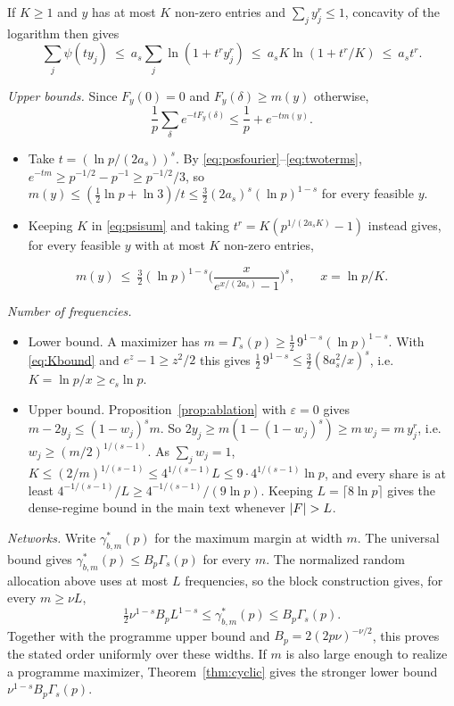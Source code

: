 If $K\ge1$ and $y$ has at most $K$ non-zero entries and $\sum_jy_j^r\le1$, concavity of the logarithm then gives
\begin{equation}
\sum_j\psi(ty_j)\ \le\ a_s\sum_j\ln(1+t^ry_j^r)\ \le\ a_sK\ln(1+t^r/K)\ \le\ a_st^r .
\label{eq:psisum}
\end{equation}

\emph{Upper bounds.} Since $F_y(0)=0$ and $F_y(\delta)\ge m(y)$ otherwise,
\begin{equation}
\frac1p\sum_\delta e^{-tF_y(\delta)}\le\frac1p+e^{-tm(y)}.
\label{eq:twoterms}
\end{equation}
\begin{itemize}
\item Take $t=(\ln p/(2a_s))^s$. By \eqref{eq:posfourier}--\eqref{eq:twoterms}, $e^{-tm}\ge p^{-1/2}-p^{-1}\ge p^{-1/2}/3$, so $m(y)\le(\frac12\ln p+\ln3)/t\le\frac32(2a_s)^s(\ln p)^{1-s}$ for every feasible $y$.
\item Keeping $K$ in \eqref{eq:psisum} and taking $t^r=K(p^{1/(2a_sK)}-1)$ instead gives, for every feasible $y$ with at most $K$ non-zero entries,
\end{itemize}
\begin{equation}
m(y)\ \le\ \tfrac32(\ln p)^{1-s}\Big(\frac{x}{e^{x/(2a_s)}-1}\Big)^s,\qquad x=\ln p/K.
\label{eq:Kbound}
\end{equation}

\emph{Number of frequencies.}
\begin{itemize}
\item Lower bound. A maximizer has $m=\Gamma_s(p)\ge\tfrac12\,9^{1-s}(\ln p)^{1-s}$. With \eqref{eq:Kbound} and $e^z-1\ge z^2/2$ this gives $\tfrac12\,9^{1-s}\le\frac32(8a_s^2/x)^s$, i.e.\ $K=\ln p/x\ge c_s\ln p$.
\item Upper bound. Proposition~\ref{prop:ablation} with $\varepsilon=0$ gives $m-2y_j\le(1-w_j)^sm$. So $2y_j\ge m(1-(1-w_j)^s)\ge m\,w_j=m\,y_j^r$, i.e.\ $w_j\ge(m/2)^{1/(s-1)}$. As $\sum_jw_j=1$, $K\le(2/m)^{1/(s-1)}\le4^{1/(s-1)}L\le9\cdot4^{1/(s-1)}\ln p$, and every share is at least $4^{-1/(s-1)}/L\ge4^{-1/(s-1)}/(9\ln p)$. Keeping $L=\lceil8\ln p\rceil$ gives the dense-regime bound in the main text whenever $|\Fp|>L$.
\end{itemize}

\emph{Networks.} Write $\gamma^*_{b,m}(p)$ for the maximum margin at width $m$. The universal bound gives $\gamma^*_{b,m}(p)\le B_p\Gamma_s(p)$ for every $m$. The normalized random allocation above uses at most $L$ frequencies, so the block construction gives, for every $m\ge\nu L$,
\[
\tfrac12\nu^{1-s}B_pL^{1-s}\le\gamma^*_{b,m}(p)\le B_p\Gamma_s(p).
\]
Together with the programme upper bound and $B_p=2(2p\nu)^{-\nu/2}$, this proves the stated order uniformly over these widths. If $m$ is also large enough to realize a programme maximizer, Theorem~\ref{thm:cyclic} gives the stronger lower bound $\nu^{1-s}B_p\Gamma_s(p)$.

